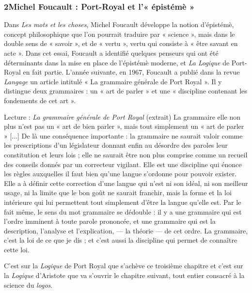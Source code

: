 \subsubsection*{2\quad Michel Foucault : Port-Royal et l’« épistémè »}
Dans \textit{Les mots et les choses}, Michel Foucault développe la notion d’épistémè, concept philosophique que l’on pourrait traduire par « science », mais dans le double sens de « savoir », et de « vertu », vertu qui consiste à « être savant en acte ». Dans cet essai, Foucault a identifié quelques penseurs qui ont été déterminants dans la mise en place de l’épistémè moderne, et \textit{La Logique} de Port-Royal en fait partie. L’année suivante, en 1967, Foucault a publié dans la revue \textit{Langage} un article intitulé « La grammaire générale de Port Royal ». Il y distingue deux grammaires : un « art de parler » et une « discipline contenant les fondements de cet art ».
\begin{lecture}{Lecture : \textit{La grammaire générale de Port Royal} (extrait)}
La grammaire elle non plus n’est pas un « art de bien parler », mais tout simplement un « art de parler » [...] De là une conséquence importante : la grammaire ne saurait valoir comme les prescriptions d’un législateur donnant enfin au désordre des paroles leur constitution et leurs lois ; elle ne saurait être non plus comprise comme un recueil des conseils donnés par un correcteur vigilant. Elle est une discipline qui énonce les règles auxquelles il faut bien qu’une langue s’ordonne pour pouvoir exister. Elle a à définir cette correction d’une langue qui n’est ni son idéal, ni son meilleur usage, ni la limite que le bon goût ne saurait franchir, mais la forme et la loi intérieure qui lui permettent tout simplement d’être la langue qu’elle est. Par le fait même, le sens du mot grammaire se dédouble : il y a une grammaire qui est l’ordre imminent à toute parole prononcée, et une grammaire qui est la description, l’analyse et l’explication, — la théorie — de cet ordre. La grammaire, c’est la loi de ce que je dis ; et c’est aussi la discipline qui permet de connaître cette loi.
\end{lecture}
C’est sur la \textit{Logique} de Port Royal que s’achève ce troisième chapitre et c’est sur la \textit{Logique} d’Aristote que va s’ouvrir le chapitre suivant, tout entier consacré à la science du \textit{logos}.
\clearpage
